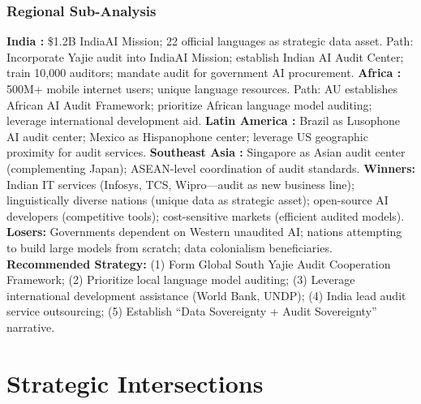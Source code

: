 \documentclass[11pt,a4paper]{article}
\theoremstyle{definition}
\theoremstyle{remark}
\begin{document}
\subsubsection{Regional Sub-Analysis }
\textbf{India :} \$1.2B IndiaAI Mission; 22 official languages as strategic data asset. Path: Incorporate Yajie audit into IndiaAI Mission; establish Indian AI Audit Center; train 10,000 auditors; mandate audit for government AI procurement.
\textbf{Africa :} 500M+ mobile internet users; unique language resources. Path: AU establishes African AI Audit Framework; prioritize African language model auditing; leverage international development aid.
\textbf{Latin America :} Brazil as Lusophone AI audit center; Mexico as Hispanophone center; leverage US geographic proximity for audit services.
\textbf{Southeast Asia :} Singapore as Asian audit center (complementing Japan); ASEAN-level coordination of audit standards.
\textbf{Winners:} Indian IT services (Infosys, TCS, Wipro---audit as new business line); linguistically diverse nations (unique data as strategic asset); open-source AI developers (competitive tools); cost-sensitive markets (efficient audited models).
\textbf{Losers:} Governments dependent on Western unaudited AI; nations attempting to build large models from scratch; data colonialism beneficiaries.
\textbf{Recommended Strategy:} (1) Form Global South Yajie Audit Cooperation Framework; (2) Prioritize local language model auditing; (3) Leverage international development assistance (World Bank, UNDP); (4) India lead audit service outsourcing; (5) Establish ``Data Sovereignty + Audit Sovereignty'' narrative.
\section{Strategic Intersections}
\label{sec:intersections}
\end{document}
